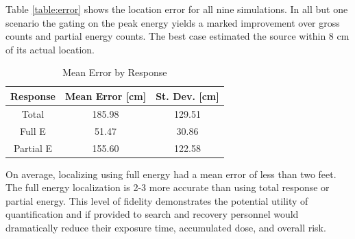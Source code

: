 Table \ref{table:error} shows the location error for all nine simulations. In all but one scenario the gating on the peak energy yields a marked improvement over gross counts and partial energy counts. The best case estimated the source within 8 cm of its actual location.

\begin{table}[!htp]
 \caption{Mean Error by Response}
  \begin{center}
    \begin{tabulary}{\columnwidth}{ccc}
      \hline
      Response & Mean Error [cm] & St. Dev. [cm] \\ \hline
      Total & 185.98 & 129.51 \\
      Full E & 51.47 & 30.86\\
      Partial E & 155.60 & 122.58 \\\hline
    \end{tabulary}
  \end{center}
  \label{table:toterror}
\end{table}

On average, localizing using full energy had a mean error of less than two feet. The full energy localization is 2-3 more accurate than using total response or partial energy. This level of fidelity demonstrates the potential utility of quantification and if provided to search and recovery personnel would dramatically reduce their exposure time, accumulated dose, and overall risk.
